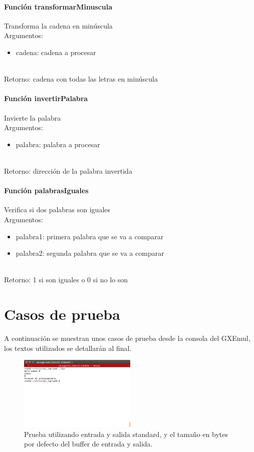 \documentclass[a4paper]{article}
\begin{document}
\paragraph{Función transformarMinuscula}
Transforma la cadena en minúscula \\
Argumentos:
	\begin{itemize}
	\item cadena: cadena a procesar
\end{itemize} \\
Retorno: cadena con todas las letras en minúscula


\paragraph{Función invertirPalabra}
Invierte la palabra \\
Argumentos: 
	\begin{itemize}
	\item palabra: palabra a procesar
	\end{itemize} \\
Retorno: dirección de la palabra invertida


\paragraph{Función palabrasIguales}
Verifica si dos palabras son iguales \\
Argumentos:
\begin{itemize}
	\item palabra1: primera palabra que se va a comparar
	\item palabra2: segunda palabra que se va a comparar
\end{itemize} \\
Retorno: 1 si son iguales o 0 si no lo son


\pagebreak
\section{Casos de prueba}

A continuación se muestran unos casos de prueba desde la consola del GXEmul, los textos utilizados se detallarán al final.


\begin{figure}[!htp]
\begin{center}
\includegraphics[width=0.5\textwidth]{imagenes_casosDePrueba_tp1/prueba0.png}
\caption{Prueba utilizando entrada y salida standard, y el tamaño en bytes por defecto del buffer de entrada y salida.} \label{fig001}
\end{center}
\end{figure}
\end{document}

